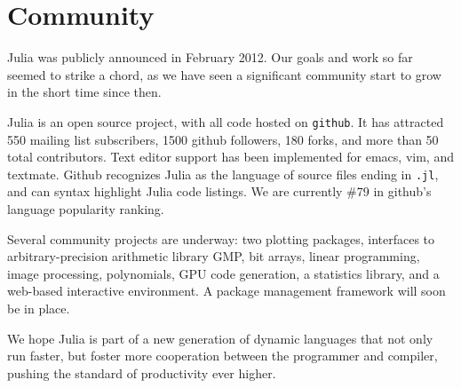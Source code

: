 \documentclass[9pt]{sigplanconf}
\newcommand{\Matlab}{MATLAB\textsuperscript{\tiny\textregistered}}
\begin{document}



\section{Community}

Julia was publicly announced in February 2012. Our goals and work so
far seemed to strike a chord, as we have seen a significant community
start to grow in the short time since then.

Julia is an open source project, with all code hosted on {\tt github}.
It has attracted 550 mailing list subscribers, 1500 github followers,
180 forks, and more than 50 total contributors. Text editor support
has been implemented for emacs, vim, and textmate.
Github recognizes Julia as the language of source files ending in
{\tt .jl}, and can syntax highlight Julia code listings.
We are currently \#79 in github's language popularity ranking.

Several community projects are underway: two plotting packages,
interfaces to arbitrary-precision arithmetic library GMP,
bit arrays, linear programming, image processing, polynomials,
GPU code generation, a statistics library, and a web-based interactive
environment. A package management framework will soon be in place.

We hope Julia is part of a new generation of dynamic languages that not
only run faster, but foster more cooperation between the programmer
and compiler, pushing the standard of productivity ever higher.
\end{document}
